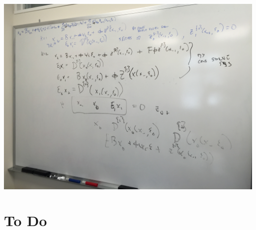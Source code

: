 \documentclass[12pt]{article}
\begin{document}
\includegraphics[angle=90,width=7.5in]{IMG_4591.JPG}

\newpage

\section{To Do}
\label{sec:do}
\end{document}
